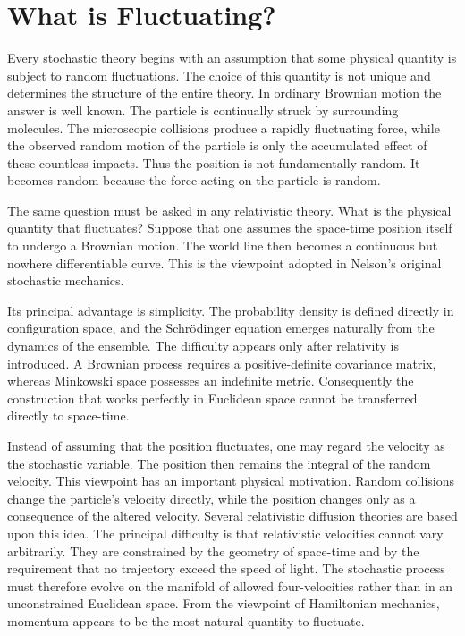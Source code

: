 \section{What is Fluctuating?}
Every stochastic theory begins with an assumption that some physical
quantity is subject to random fluctuations. The choice of this quantity
is not unique and determines the structure of the entire theory.
In ordinary Brownian motion the answer is well known. The particle is
continually struck by surrounding molecules. The microscopic collisions
produce a rapidly fluctuating force, while the observed random motion of
the particle is only the accumulated effect of these countless impacts.
Thus the position is not fundamentally random. It becomes random because
the force acting on the particle is random.

The same question must be asked in any relativistic theory.
What is the physical quantity that fluctuates?
Suppose that one assumes the space-time position itself to undergo a
Brownian motion.
The world line then becomes a continuous but nowhere differentiable
curve. This is the viewpoint adopted in Nelson's original stochastic
mechanics.

Its principal advantage is simplicity. The probability density is
defined directly in configuration space, and the Schrödinger equation
emerges naturally from the dynamics of the ensemble.
The difficulty appears only after relativity is introduced.
A Brownian process requires a positive-definite covariance matrix,
whereas Minkowski space possesses an indefinite metric. Consequently the
construction that works perfectly in Euclidean space cannot be
transferred directly to space-time.

Instead of assuming that the position fluctuates, one may regard the
velocity as the stochastic variable.
The position then remains the integral of the random velocity.
This viewpoint has an important physical motivation.
Random collisions change the particle's velocity directly, while the
position changes only as a consequence of the altered velocity.
Several relativistic diffusion theories are based upon this idea.
The principal difficulty is that relativistic velocities cannot vary
arbitrarily. They are constrained by the geometry of space-time and by
the requirement that no trajectory exceed the speed of light.
The stochastic process must therefore evolve on the manifold of allowed
four-velocities rather than in an unconstrained Euclidean space.
From the viewpoint of Hamiltonian mechanics, momentum appears to be the
most natural quantity to fluctuate.


